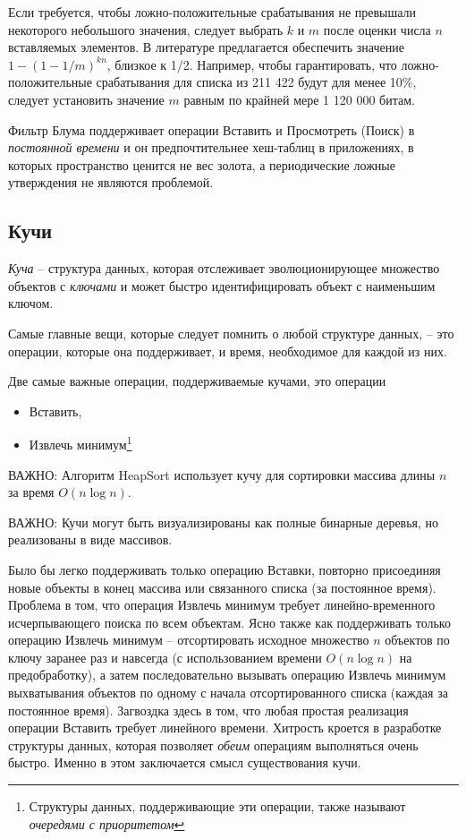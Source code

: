 \documentclass[%
	11pt,
	a4paper,
	utf8,
		]{article}
\begin{document}
Если требуется, чтобы ложно-положительные срабатывания не превышали некоторого небольшого значения, следует выбрать $ k $ и $ m $ после оценки числа $ n $ вставляемых элементов. В литературе предлагается обеспечить значение $ 1 - (1 - 1/m)^{kn} $, близкое к 1/2.
Например, чтобы гарантировать, что ложно-положительные срабатывания для списка из 211 422 будут для менее 10\%, следует установить значение $ m $ равным по крайней мере 1 120 000 битам.

Фильтр Блума поддерживает операции Вставить и Просмотреть (Поиск) в \emph{постоянной времени} и он предпочтительнее хеш-таблиц в приложениях, в которых пространство ценится не вес золота, а периодические ложные утверждения не являются проблемой.



\subsection{Кучи}

\emph{Куча} -- структура данных, которая отслеживает эволюционирующее множество объектов с \emph{ключами} и может быстро идентифицировать объект с наименьшим ключом.

Самые главные вещи, которые следует помнить о любой структуре данных, -- это операции, которые она поддерживает, и время, необходимое для каждой из них.

Две самые важные операции, поддерживаемые кучами, это операции
\begin{itemize}
	\item \textsf{Вставить},
	
	\item \textsf{Извлечь минимум}\footnote{Структуры данных, поддерживающие эти операции, также называют \emph{очередями с приоритетом}}
\end{itemize}

ВАЖНО: Алгоритм HeapSort использует кучу для сортировки массива длины $ n $ за время $ O(n \log n) $.

ВАЖНО: Кучи могут быть визуализированы как полные бинарные деревья, но реализованы в виде массивов.

Было бы легко поддерживать только операцию \textsf{Вставки}, повторно присоединяя новые объекты в конец массива или связанного списка (за постоянное время). Проблема в том, что операция \textsf{Извлечь минимум} требует линейно-временного исчерпывающего поиска по всем объектам. Ясно также как поддерживать только операцию \textsf{Извлечь минимум} -- отсортировать исходное множество $ n $ объектов по ключу заранее раз и навсегда (с использованием времени $ O(n \log n) $ на предобработку), а затем последовательно вызывать операцию \textsf{Извлечь минимум} выхватывания объектов по одному с начала отсортированного списка (каждая за постоянное время). Загвоздка здесь в том, что любая простая реализация операции \textsf{Вставить} требует линейного времени. Хитрость кроется в разработке структуры данных, которая позволяет \emph{обеим} операциям выполняться очень быстро. Именно в этом заключается смысл существования кучи.
\end{document}
